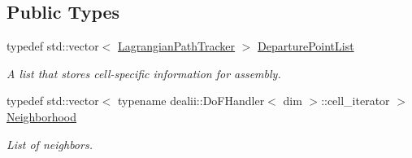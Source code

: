 \subsection*{Public Types}
\begin{DoxyCompactItemize}
\item 
\hypertarget{classnatrium_1_1SemiLagrangian_a0f63be1763c4063ccdf2ff4bee7a3456}{
typedef std::vector$<$ \hyperlink{structnatrium_1_1SemiLagrangian_1_1LagrangianPathTracker}{LagrangianPathTracker} $>$ \hyperlink{classnatrium_1_1SemiLagrangian_a0f63be1763c4063ccdf2ff4bee7a3456}{DeparturePointList}}
\label{classnatrium_1_1SemiLagrangian_a0f63be1763c4063ccdf2ff4bee7a3456}

\begin{DoxyCompactList}\small\item\em A list that stores cell-\/specific information for assembly. \item\end{DoxyCompactList}\item 
\hypertarget{classnatrium_1_1SemiLagrangian_a8a801296be3b37837a347342f32b2d57}{
typedef std::vector$<$ typename dealii::DoFHandler$<$ dim $>$::cell\_\-iterator $>$ \hyperlink{classnatrium_1_1SemiLagrangian_a8a801296be3b37837a347342f32b2d57}{Neighborhood}}
\label{classnatrium_1_1SemiLagrangian_a8a801296be3b37837a347342f32b2d57}

\begin{DoxyCompactList}\small\item\em List of neighbors. \item\end{DoxyCompactList}\end{DoxyCompactItemize}
